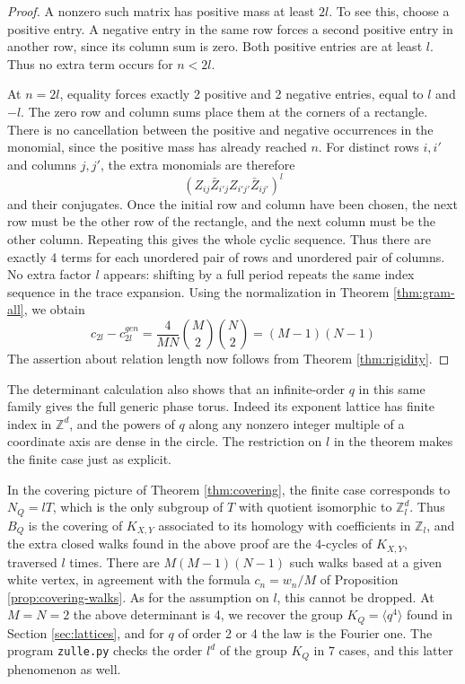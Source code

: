 \documentclass[11pt,reqno]{amsart}
\theoremstyle{definition}
\numberwithin{equation}{section}
\begin{document}
\begin{proof}
A nonzero such matrix has positive mass at least $2l$. To see this, choose a positive entry. A negative entry in the same row forces a second positive entry in another row, since its column sum is zero. Both positive entries are at least $l$. Thus no extra term occurs for $n<2l$.

At $n=2l$, equality forces exactly 2 positive and 2 negative entries, equal to $l$ and $-l$. The zero row and column sums place them at the corners of a rectangle. There is no cancellation between the positive and negative occurrences in the monomial, since the positive mass has already reached $n$. For distinct rows $i,i'$ and columns $j,j'$, the extra monomials are therefore
$$\left(Z_{ij}\bar Z_{i'j}Z_{i'j'}\bar Z_{ij'}\right)^l$$
and their conjugates. Once the initial row and column have been chosen, the next row must be the other row of the rectangle, and the next column must be the other column. Repeating this gives the whole cyclic sequence. Thus there are exactly 4 terms for each unordered pair of rows and unordered pair of columns. No extra factor $l$ appears: shifting by a full period repeats the same index sequence in the trace expansion. Using the normalization in Theorem \ref{thm:gram-all}, we obtain
$$c_{2l}-c_{2l}^{gen}=\frac4{MN}\binom M2\binom N2=(M-1)(N-1)$$
The assertion about relation length now follows from Theorem \ref{thm:rigidity}.
\end{proof}

The determinant calculation also shows that an infinite-order $q$ in this same family gives the full generic phase torus. Indeed its exponent lattice has finite index in $\mathbb Z^d$, and the powers of $q$ along any nonzero integer multiple of a coordinate axis are dense in the circle. The restriction on $l$ in the theorem makes the finite case just as explicit.

In the covering picture of Theorem \ref{thm:covering}, the finite case corresponds to $N_Q=lT$, which is the only subgroup of $T$ with quotient isomorphic to $\mathbb Z_l^d$. Thus $B_Q$ is the covering of $K_{X,Y}$ associated to its homology with coefficients in $\mathbb Z_l$, and the extra closed walks found in the above proof are the 4-cycles of $K_{X,Y}$, traversed $l$ times. There are $M(M-1)(N-1)$ such walks based at a given white vertex, in agreement with the formula $c_n=w_n/M$ of Proposition \ref{prop:covering-walks}. As for the assumption on $l$, this cannot be dropped. At $M=N=2$ the above determinant is 4, we recover the group $K_Q=\langle q^4\rangle$ found in Section \ref{sec:lattices}, and for $q$ of order 2 or 4 the law is the Fourier one. The program \texttt{zulle.py} checks the order $l^d$ of the group $K_Q$ in 7 cases, and this latter phenomenon as well.
\end{document}
